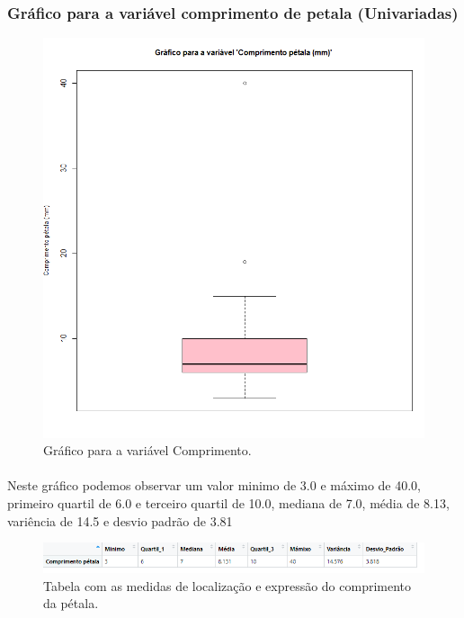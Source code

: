 \documentclass{article}
\begin{document}
\subsubsection{Gráfico para a variável comprimento de petala (Univariadas)}
\begin{figure}[h]
       \centering %
        \includegraphics[scale=0.6]{gráfico comprimento pétala.png}
       \caption{Gráfico para a variável Comprimento.}
       \label{fig:logo}
    \end{figure}

\paragraph{}Neste gráfico podemos observar um valor minimo de 3.0 e máximo de 40.0, primeiro quartil de 6.0 e terceiro quartil de 10.0, mediana de 7.0, média de 8.13, variência de 14.5 e desvio padrão de 3.81

\begin{figure}[h]
       \centering %
        \includegraphics[scale=0.8]{tabela_compriento.png}
       \caption{Tabela com as medidas de localização e expressão do comprimento da pétala.}
       \label{fig:logo}
    \end{figure}
    
\end{document}
